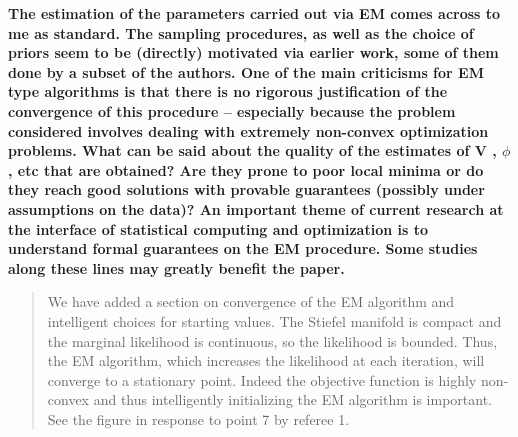 \documentclass{article}
\newenvironment{resp}{\begin{quotation}\noindent\slshape}{\end{quotation}}
\newcommand{\todo}[1]{{\textsf{\textcolor{red}{TODO: #1}}}}
\begin{document}


\textbf{The estimation of the parameters carried out via EM comes across to me as standard. The sampling procedures, as well as the choice of priors seem to be (directly) motivated via earlier work, some of them done by a subset of the authors.  One of the main criticisms for EM type algorithms is that there is no rigorous justification of the convergence of this procedure – especially because the problem considered involves dealing with extremely non-convex optimization problems. What can be said about the quality of the estimates of V , $\phi$, etc that are obtained? Are they prone to poor local minima or do they reach good solutions with provable guarantees (possibly under assumptions on the data)? An important theme of current research at the interface of statistical computing and optimization is to understand formal guarantees on the EM procedure.  Some studies along these lines may greatly benefit the paper.}

\begin{resp}


We have added a section  on convergence of the EM algorithm and intelligent choices for starting values.  The Stiefel manifold is compact and the marginal
  likelihood is continuous, so the likelihood is bounded.  Thus, the EM
  algorithm, which increases the likelihood at each iteration, will converge to a stationary point.  Indeed the objective function is highly non-convex and thus intelligently initializing the EM algorithm is important.  See the figure in response to point 7 by referee 1.  %
\end{resp}
\end{document}
